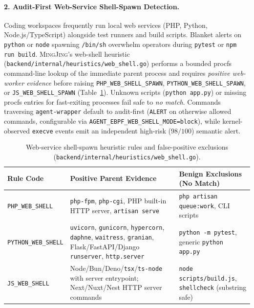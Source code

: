 \documentclass[10pt,twocolumn,letterpaper]{article}
\newcommand{\sys}{\textsc{MingJing}}
\newcommand{\code}[1]{\texttt{\small #1}}
\begin{document}
\paragraph{2. Audit-First Web-Service Shell-Spawn Detection.} Coding workspaces frequently run local web services (PHP, Python, Node.js/TypeScript) alongside test runners and build scripts. Blanket alerts on \code{python} or \code{node} spawning \code{/bin/sh} overwhelm operators during \code{pytest} or \code{npm run build}. \sys{}'s web-shell heuristic (\code{backend/internal/heuristics/web\_shell.go}) performs a bounded procfs command-line lookup of the immediate parent process and requires \emph{positive web-worker evidence} before raising \code{PHP\_WEB\_SHELL\_SPAWN}, \code{PYTHON\_WEB\_SHELL\_SPAWN}, or \code{JS\_WEB\_SHELL\_SPAWN} (Table~\ref{tab:webshell}). Unknown scripts (\code{python app.py}) or missing procfs entries for fast-exiting processes fail safe to \emph{no match}. Commands traversing \code{agent-wrapper} default to audit-first (\code{ALERT} on otherwise allowed commands, configurable via \code{AGENT\_EBPF\_WEB\_SHELL\_MODE=block}), while kernel-observed \code{execve} events emit an independent high-risk ($98/100$) semantic alert.

\begin{table}[t]
\centering
\footnotesize
\caption{Web-service shell-spawn heuristic rules and false-positive exclusions (\code{backend/internal/heuristics/web\_shell.go}).}
\label{tab:webshell}
\begin{tabularx}{\columnwidth}{@{}lXX@{}}
\toprule
\textbf{Rule Code} & \textbf{Positive Parent Evidence} & \textbf{Benign Exclusions (No Match)} \\
\midrule
\code{PHP\_WEB\_SHELL} & \code{php-fpm}, \code{php-cgi}, PHP built-in HTTP server, \code{artisan serve} & \code{php artisan queue:work}, CLI scripts \\
\addlinespace[2pt]
\code{PYTHON\_WEB\_SHELL} & \code{uvicorn}, \code{gunicorn}, \code{hypercorn}, \code{daphne}, \code{waitress}, \code{granian}, Flask/FastAPI/Django \code{runserver}, \code{http.server} & \code{python -m pytest}, generic \code{python app.py} \\
\addlinespace[2pt]
\code{JS\_WEB\_SHELL} & Node/Bun/Deno/\code{tsx}/\code{ts-node} with server entrypoint; Next/Nuxt/Nest HTTP server commands & \code{node scripts/build.js}, \code{shellcheck} (substring safe) \\
\bottomrule
\end{tabularx}
\end{table}
\end{document}
